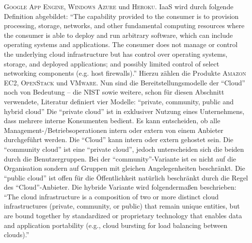 \textsc{Google App Engine}, \textsc{Windows Azure} und \textsc{Heroku}.\autocite[vgl.][S.\,8]{kumar_reliability_2018} \ac{IaaS} wird durch folgende Definition abgebildet: \enquote{The capability provided to the consumer is to provision processing, storage, networks, and other fundamental computing resources where the consumer is able to deploy and run arbitrary software, which can include operating systems and applications. The consumer does not manage or control the underlying cloud infrastructure but has control over operating systems, storage, and deployed applications; and possibly limited control of select networking components (e.g. host firewalls).}\autocite[][S.\,3]{mell_nist_2011} Hierzu zählen die Produkte \textsc{Amazon EC2}, \textsc{OpenStack} und \textsc{VMware}. Nun sind die Bereitstellungsmodelle der \enquote{Cloud} noch von Bedeutung -- die \ac{NIST} sowie weitere, schon für diesen Abschnitt verwendete, Literatur definiert vier Modelle: \enquote{private, community, public and hybrid cloud} Die \enquote{private cloud} ist in exklusiver Nutzung eines Unternehmens, dass mehrere interne Konsumenten bedient. Es kann entscheiden, ob alle Management-/Betriebsoperationen intern oder extern von einem Anbieter durchgeführt werden. Die \enquote{Cloud} kann intern oder extern gehostet sein. Die \enquote{community cloud} ist eine \enquote{private cloud}, jedoch unterscheiden sich die beiden durch die Benutzergruppen. Bei der \enquote{community}-Variante ist es nicht auf die Organisation sondern auf Gruppen mit gleichen Angelegenheiten beschränkt. Die \enquote{public cloud} ist offen für die Öffentlichkeit natürlich beschränkt durch die Regel des \enquote{Cloud}-Anbieter. Die hybride Variante wird folgendermaßen beschrieben: \enquote{The cloud infrastructure is a composition of two or more distinct cloud infrastructures (private, community, or public) that remain unique entities, but are bound together by standardized or proprietary technology that enables data and application portability (e.g., cloud bursting for load balancing between clouds).}\autocite[][S.\,3]{mell_nist_2011}



